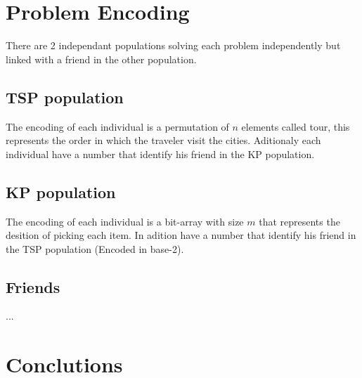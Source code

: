 \documentclass[twocolumn]{IEEEtran}
\begin{document}
\section{Problem Encoding}

There are 2 independant populations solving each problem independently but linked with a friend in the other population. %

\subsection{TSP population}
The encoding of each individual is a permutation of $n$ elements called tour,
this represents the order in which the traveler visit the cities. 
Aditionaly each individual have a number that identify his friend in the KP population.

\subsection{KP population}
The encoding of each individual is a bit-array with size $m$ that represents the desition of picking each item.
In adition have a number that identify his friend in the TSP population (Encoded in base-2).

\subsection{Friends}
...

\section{Conclutions}

    
\end{document}
